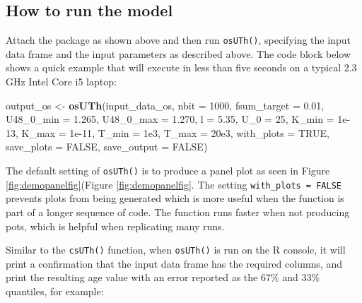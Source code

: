 \documentclass[]{elsarticle} %
\newenvironment{Shaded}{\begin{snugshade}}{\end{snugshade}}
\newcommand{\DataTypeTok}[1]{\textcolor[rgb]{0.13,0.29,0.53}{#1}}
\newcommand{\DecValTok}[1]{\textcolor[rgb]{0.00,0.00,0.81}{#1}}
\newcommand{\FloatTok}[1]{\textcolor[rgb]{0.00,0.00,0.81}{#1}}
\newcommand{\KeywordTok}[1]{\textcolor[rgb]{0.13,0.29,0.53}{\textbf{#1}}}
\newcommand{\NormalTok}[1]{#1}
\newcommand{\OtherTok}[1]{\textcolor[rgb]{0.56,0.35,0.01}{#1}}
\newcommand{\StringTok}[1]{\textcolor[rgb]{0.31,0.60,0.02}{#1}}
\begin{document}
\hypertarget{how-to-run-the-model-1}{%
\subsection{How to run the model}\label{how-to-run-the-model-1}}

Attach the package as shown above and then run \texttt{osUTh()}, specifying the input data frame and the input parameters as described above. The code block below shows a quick example that will execute in less than five seconds on a typical 2.3 GHz Intel Core i5 laptop:

\begin{Shaded}
\begin{Highlighting}[]
\NormalTok{output\_os \textless{}{-}}\StringTok{ }\KeywordTok{osUTh}\NormalTok{(input\_data\_os,}
                   \DataTypeTok{nbit =} \DecValTok{1000}\NormalTok{,}
                   \DataTypeTok{fsum\_target =} \FloatTok{0.01}\NormalTok{,}
                   \DataTypeTok{U48\_0\_min =} \FloatTok{1.265}\NormalTok{,}
                   \DataTypeTok{U48\_0\_max =} \FloatTok{1.270}\NormalTok{,}
                   \DataTypeTok{l =} \FloatTok{5.35}\NormalTok{,}
                   \DataTypeTok{U\_0 =} \DecValTok{25}\NormalTok{,}
                   \DataTypeTok{K\_min =} \FloatTok{1e{-}13}\NormalTok{,}
                   \DataTypeTok{K\_max =} \FloatTok{1e{-}11}\NormalTok{,}
                   \DataTypeTok{T\_min =} \FloatTok{1e3}\NormalTok{,}
                   \DataTypeTok{T\_max =} \FloatTok{20e3}\NormalTok{,}
                   \DataTypeTok{with\_plots =} \OtherTok{TRUE}\NormalTok{,}
                   \DataTypeTok{save\_plots =} \OtherTok{FALSE}\NormalTok{,}
                   \DataTypeTok{save\_output =} \OtherTok{FALSE}\NormalTok{)}
\end{Highlighting}
\end{Shaded}

The default setting of \texttt{osUTh()} is to produce a panel plot as seen in Figure \ref{fig:demopanelfig}(Figure \ref{fig:demopanelfig}. The setting \texttt{with\_plots\ =\ FALSE} prevents plots from being generated which is more useful when the function is part of a longer sequence of code. The function runs faster when not producing pots, which is helpful when replicating many runs.

Similar to the \texttt{csUTh()} function, when \texttt{osUTh()} is run on the R console, it will print a confirmation that the input data frame has the required columns, and print the resulting age value with an error reported as the 67\% and 33\% quantiles, for example:
\end{document}
